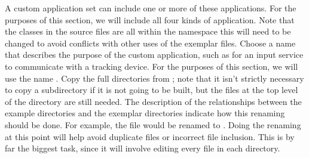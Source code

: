 A custom application set can include one or more of these applications.
For the purposes of this section, we will include all four kinds of application.
\tertiaryEnd
{}
Note that the classes in the source files are all within the 
namespace \longDash{} this will need to be changed to avoid conflicts with other uses of
the exemplar files.
Choose a name that describes the purpose of the custom application, such as
 for an input service to communicate with a tracking device.
For the purposes of this section, we will use the name .
\tertiaryEnd
{}
Copy the full directories from ; note that it isn't strictly necessary
to copy a subdirectory if it is not going to be built, but the files at the top level of
the directory are still needed.
\tertiaryEnd
{}
The description of the relationships between the example directories and the exemplar
directories indicate how this renaming should be done.
For example, the file  would be renamed to
.
Doing the renaming at this point will help avoid duplicate files or incorrect file
inclusion.
\tertiaryEnd
{}
This is by far the biggest task, since it will involve editing every file in each
directory.
